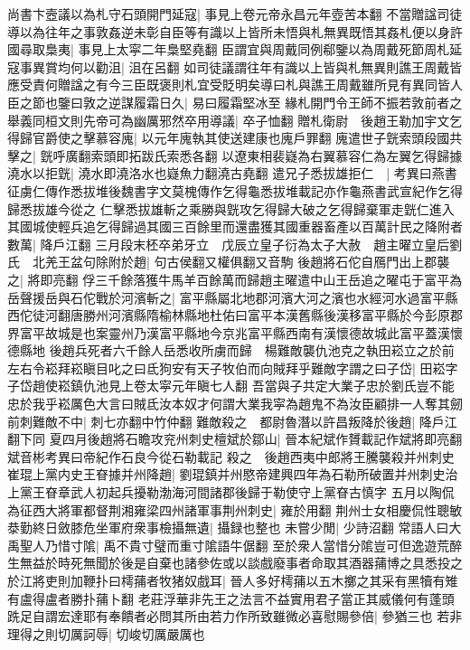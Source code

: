 尚書卞壼議以為札守石頭開門延寇|{
	事見上卷元帝永昌元年壺苦本翻}
不當贈諡司徒導以為往年之事敦姦逆未彰自臣等有識以上皆所未悟與札無異既悟其姦札便以身許國尋取梟夷|{
	事見上太寜二年梟堅堯翻}
臣謂宜與周戴同例郗鑒以為周戴死節周札延寇事異賞均何以勸沮|{
	沮在呂翻}
如司徒議謂往年有識以上皆與札無異則譙王周戴皆應受責何贈諡之有今三臣既褒則札宜受貶明矣導曰札與譙王周戴雖所見有異同皆人臣之節也鑒曰敦之逆謀履霜日久|{
	易曰履霜堅冰至}
緣札開門令王師不振若敦前者之舉義同桓文則先帝可為幽厲邪然卒用導議|{
	卒子恤翻}
贈札衛尉　後趙王勒加宇文乞得歸官爵使之擊慕容廆|{
	以元年廆執其使送建康也廆戶罪翻}
廆遣世子皝索頭段國共擊之|{
	皝呼廣翻索頭即拓跋氏索悉各翻}
以遼東相裴嶷為右翼慕容仁為左翼乞得歸據澆水以拒皝|{
	澆水即澆洛水也嶷魚力翻澆古堯翻}
遣兄子悉拔雄拒仁　|{
	考異曰燕書征虜仁傳作悉拔堆後魏書字文莫槐傳作乞得龜悉拔堆載記亦作龜燕書武宣紀作乞得歸悉拔雄今從之}
仁擊悉拔雄斬之乘勝與皝攻乞得歸大破之乞得歸棄軍走皝仁進入其國城使輕兵追乞得歸過其國三百餘里而還盡獲其國重器畜產以百萬計民之降附者數萬|{
	降戶江翻}
三月段末柸卒弟牙立　戊辰立皇子衍為太子大赦　趙主曜立皇后劉氏　北羌王盆句除附於趙|{
	句古侯翻又權俱翻又音駒}
後趙將石佗自鴈門出上郡襲之|{
	將即亮翻}
俘三千餘落獲牛馬羊百餘萬而歸趙主曜遣中山王岳追之曜屯于富平為岳聲援岳與石佗戰於河濱斬之|{
	富平縣屬北地郡河濱大河之濱也水經河水過富平縣西佗徒河翻唐勝州河濱縣隋榆林縣地杜佑曰富平本漢舊縣後漢移富平縣於今彭原郡界富平故城是也案靈州乃漢富平縣地今京兆富平縣西南有漢懷德故城此富平蓋漢懷德縣地}
後趙兵死者六千餘人岳悉收所虜而歸　楊難敵襲仇池克之執田崧立之於前左右令崧拜崧瞋目叱之曰氐狗安有天子牧伯而向賊拜乎難敵字謂之曰子岱|{
	田崧字子岱趙使崧鎮仇池見上卷太寜元年瞋七人翻}
吾當與子共定大業子忠於劉氏豈不能忠於我乎崧厲色大言曰賊氐汝本奴才何謂大業我寜為趙鬼不為汝臣顧排一人奪其劒前刺難敵不中|{
	刺七亦翻中竹仲翻}
難敵殺之　都尉魯潛以許昌叛降於後趙|{
	降戶江翻下同}
夏四月後趙將石瞻攻兖州刺史檀斌於鄒山|{
	晉本紀斌作贇載記作斌將即亮翻斌音彬考異曰帝紀作石良今從石勒載記}
殺之　後趙西夷中郎將王騰襲殺并州刺史崔琨上黨内史王眘據并州降趙|{
	劉琨鎮并州愍帝建興四年為石勒所破置并州刺史治上黨王眘章武人初起兵擾勒渤海河間諸郡後歸于勒使守上黨眘古慎字}
五月以陶侃為征西大將軍都督荆湘雍梁四州諸軍事荆州刺史|{
	雍於用翻}
荆州士女相慶侃性聰敏㳟勤終日斂膝危坐軍府衆事檢攝無遺|{
	攝録也整也}
未嘗少閒|{
	少詩沼翻}
常語人曰大禹聖人乃惜寸隂|{
	禹不貴寸璧而重寸隂語牛倨翻}
至於衆人當惜分隂豈可但逸遊荒醉生無益於時死無聞於後是自棄也諸參佐或以談戲廢事者命取其酒器蒱博之具悉投之於江將吏則加鞭扑曰樗蒱者牧猪奴戲耳|{
	晉人多好樗蒱以五木擲之其采有黑犢有雉有盧得盧者勝扑蒱卜翻}
老莊浮華非先王之法言不益實用君子當正其威儀何有蓬頭跣足自謂宏達耶有奉饋者必問其所由若力作所致雖微必喜慰賜參倍|{
	參猶三也}
若非理得之則切厲訶辱|{
	切峻切厲嚴厲也}
